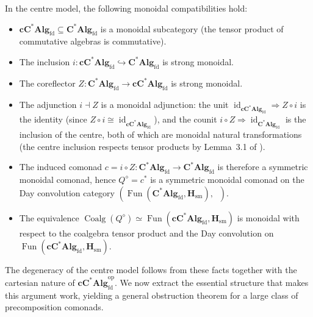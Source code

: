 \documentclass[12pt,a4paper]{article}
\theoremstyle{plain}
\theoremstyle{definition}
\DeclareMathOperator{\Coalg}{Coalg}
\DeclareMathOperator{\id}{id}
\DeclareMathOperator{\Fun}{Fun}
\DeclareMathOperator{\Day}{\otimes_{\mathrm{Day}}}
\newcommand{\CAlgfd}{\mathbf{C}^{*}\mathbf{Alg}_{\mathrm{fd}}}
\newcommand{\cCAlg}{\mathbf{cC^{*}Alg}_{\mathrm{fd}}}
\begin{document}
In the centre model, the following monoidal compatibilities hold:
\begin{itemize}[nosep]
\item $\cCAlg\subseteq\CAlgfd$ is a monoidal subcategory (the tensor product of commutative algebras is commutative).
\item The inclusion $i:\cCAlg\hookrightarrow\CAlgfd$ is strong monoidal.
\item The coreflector $Z:\CAlgfd\to\cCAlg$ is strong monoidal.
\item The adjunction $i \dashv Z$ is a monoidal adjunction: the unit $\id_{\cCAlg} \Rightarrow Z \circ i$ is the identity (since $Z \circ i \cong \id_{\cCAlg}$), and the counit $i \circ Z \Rightarrow \id_{\CAlgfd}$ is the inclusion of the centre, both of which are monoidal natural transformations (the centre inclusion respects tensor products by Lemma~3.1 of \cite{Woo2026}).
\item The induced comonad $c=i\circ Z:\CAlgfd\to\CAlgfd$ is therefore a symmetric monoidal comonad, hence $Q^{\diamond}=c^{*}$ is a symmetric monoidal comonad on the Day convolution category $(\Fun(\CAlgfd,\mathbf{H}_{\mathrm{sm}}),\Day)$.
\item The equivalence $\Coalg(Q^{\diamond})\simeq\Fun(\cCAlg,\mathbf{H}_{\mathrm{sm}})$ is monoidal with respect to the coalgebra tensor product and the Day convolution on $\Fun(\cCAlg,\mathbf{H}_{\mathrm{sm}})$.
\end{itemize}
The degeneracy of the centre model follows from these facts together with the cartesian nature of $\cCAlg^{\mathrm{op}}$.
We now extract the essential structure that makes this argument work, yielding a general obstruction theorem for a large class of precomposition comonads.
\end{document}

